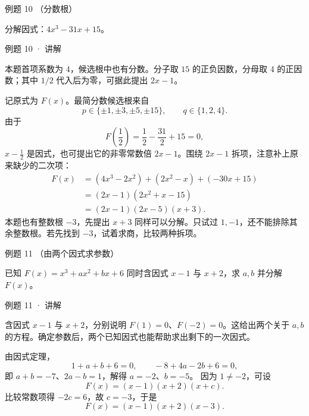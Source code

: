 \par\noindent\begin{minipage}{\linewidth}

\begin{problem}{例题 10 （分数根）}

分解因式：$4x^3-31x+15$。

\end{problem}

\begin{solution}[breakable=false]{例题 10 · 讲解}

\think 本题首项系数为 $4$，候选根中也有分数。分子取 $15$ 的正负因数，分母取 $4$ 的正因数；其中 $1/2$ 代入后为零，可据此提出 $2x-1$。

\solve 记原式为 $F(x)$。最简分数候选根来自
\[p\in\{\pm1,\pm3,\pm5,\pm15\},\qquad q\in\{1,2,4\}.
\]
由于
\[F\left(\frac12\right)=\frac12-\frac{31}{2}+15=0,\]
$x-\frac12$ 是因式，也可提出它的非零常数倍 $2x-1$。围绕 $2x-1$ 拆项，注意补上原来缺少的二次项：
\begin{align*}
F(x)&=(4x^3-2x^2)+(2x^2-x)+(-30x+15)\\
&=(2x-1)(2x^2+x-15)\\
&=(2x-1)(2x-5)(x+3).
\end{align*}
本题也有整数根 $-3$，先提出 $x+3$ 同样可以分解。只试过 $1,-1$，还不能排除其余整数根。若先找到 $-3$，试着求商，比较两种拆项。


\end{solution}

\end{minipage}\par


\par\noindent\begin{minipage}{\linewidth}

\begin{problem}{例题 11 （由两个因式求参数）}

已知 $F(x)=x^3+ax^2+bx+6$ 同时含因式 $x-1$ 与 $x+2$，求 $a,b$ 并分解 $F(x)$。

\end{problem}

\begin{solution}[breakable=false]{例题 11 · 讲解}

\think 含因式 $x-1$ 与 $x+2$，分别说明 $F(1)=0$、$F(-2)=0$。这给出两个关于 $a,b$ 的方程。确定参数后，两个已知因式也能帮助求出剩下的一次因式。

\solve 由因式定理，
\[1+a+b+6=0,\qquad -8+4a-2b+6=0,\]
即 $a+b=-7$、$2a-b=1$，解得 $a=-2$、$b=-5$。
因为 $1\ne-2$，可设
\[F(x)=(x-1)(x+2)(x+c).\]
比较常数项得 $-2c=6$，故 $c=-3$，于是
\[F(x)=(x-1)(x+2)(x-3).\]


\end{solution}

\end{minipage}\par

